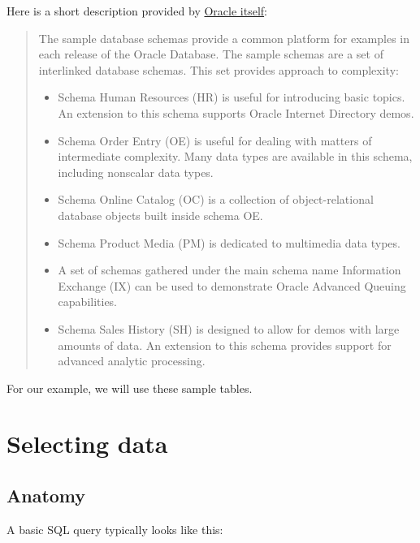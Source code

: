 \documentclass[12pt, letterpaper]{report}
\begin{document}
Here is a short description provided by \href{https://docs.oracle.com/database/121/COMSC/overview.htm#COMSC005}{Oracle itself}:
\blockquote{
The sample database schemas provide a common platform for examples in each release of the Oracle Database. The sample schemas are a set of interlinked database schemas. This set provides approach to complexity:
\begin{itemize}
	\item Schema Human Resources (HR) is useful for introducing basic topics. An extension to this schema supports Oracle Internet Directory demos.
	\item Schema Order Entry (OE) is useful for dealing with matters of intermediate complexity. Many data types are available in this schema, including nonscalar data types.
	\item Schema Online Catalog (OC) is a collection of object-relational database objects built inside schema OE.
	\item Schema Product Media (PM) is dedicated to multimedia data types.
	\item A set of schemas gathered under the main schema name Information Exchange (IX) can be used to demonstrate Oracle Advanced Queuing capabilities.
	\item Schema Sales History (SH) is designed to allow for demos with large amounts of data. An extension to this schema provides support for advanced analytic processing.
\end{itemize}
}

For our example, we will use these sample tables.

\chapter{Selecting data}
\section{Anatomy}

A basic SQL query typically looks like this:

\end{document}
